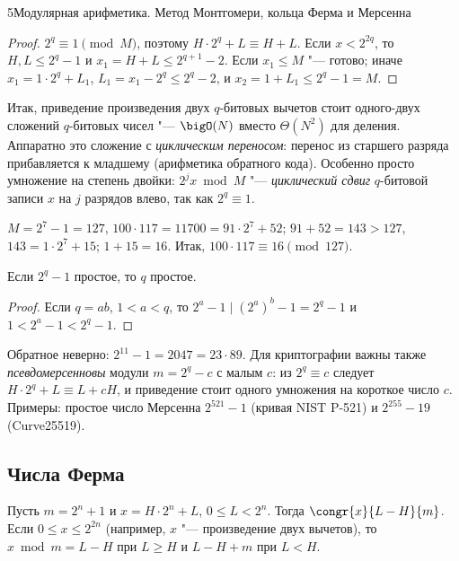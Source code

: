\begin{lecture}{5}{Модулярная арифметика. Метод Монтгомери, кольца Ферма и Мерсенна}
\begin{proof}
$2^q \equiv 1 \pmod M$, поэтому $H \cdot 2^q + L \equiv H + L$. Если $x < 2^{2q}$, то
$H, L \le 2^q - 1$ и $x_1 = H + L \le 2^{q+1} - 2$. Если $x_1 \le M$ "--- готово; иначе
$x_1 = 1 \cdot 2^q + L_1$, $L_1 = x_1 - 2^q \le 2^q - 2$, и $x_2 = 1 + L_1 \le 2^q - 1 = M$.
\end{proof}

Итак, приведение произведения двух $q$-битовых вычетов стоит одного-двух сложений $q$-битовых
чисел "--- $\bigO(N)$ вместо $\Theta(N^2)$ для деления. Аппаратно это сложение с
\emph{циклическим переносом}: перенос из старшего разряда прибавляется к младшему (арифметика
обратного кода). Особенно просто умножение на степень двойки:
$2^j x \bmod M$ "--- \emph{циклический сдвиг} $q$-битовой записи $x$ на $j$ разрядов влево,
так как $2^q \equiv 1$.

\begin{example}
$M = 2^7 - 1 = 127$, $100 \cdot 117 = 11700 = 91 \cdot 2^7 + 52$; $91 + 52 = 143 > 127$,
$143 = 1 \cdot 2^7 + 15$; $1 + 15 = 16$. Итак, $100 \cdot 117 \equiv 16 \pmod{127}$.
\end{example}


\begin{proposition}\label{l5:mersenne-prime}
Если $2^q - 1$ простое, то $q$ простое.
\end{proposition}

\begin{proof}
Если $q = ab$, $1 < a < q$, то $2^a - 1 \mid (2^a)^b - 1 = 2^q - 1$ и $1 < 2^a - 1 < 2^q - 1$.
\end{proof}

Обратное неверно: $2^{11} - 1 = 2047 = 23 \cdot 89$. Для криптографии важны также
\emph{псевдомерсенновы} модули $m = 2^q - c$ с малым $c$: из $2^q \equiv c$ следует
$H \cdot 2^q + L \equiv L + cH$, и приведение стоит одного умножения на короткое число $c$.
Примеры: простое число Мерсенна $2^{521} - 1$ (кривая NIST P-521) и $2^{255} - 19$
(Curve25519).

\subsection{Числа Ферма}

\begin{proposition}\label{l5:fermat-red}
Пусть $m = 2^n + 1$ и $x = H \cdot 2^n + L$, $0 \le L < 2^n$. Тогда $\congr{x}{L - H}{m}$.
Если $0 \le x \le 2^{2n}$ (например, $x$ "--- произведение двух вычетов), то
$x \bmod m = L - H$ при $L \ge H$ и $L - H + m$ при $L < H$.
\end{proposition}


\end{lecture}
